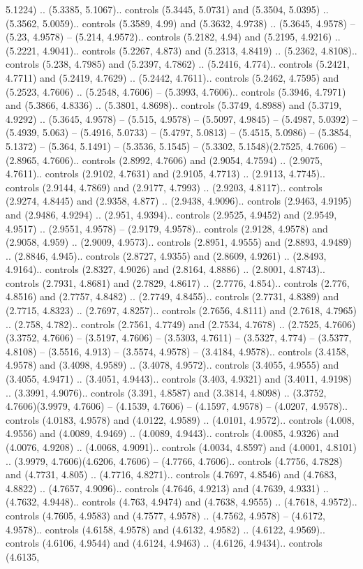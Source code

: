 5.1224) .. (5.3385, 5.1067).. controls (5.3445, 5.0731) and (5.3504, 5.0395) .. (5.3562, 5.0059).. controls (5.3589, 4.99) and (5.3632, 4.9738) .. (5.3645, 4.9578) -- (5.23, 4.9578) -- (5.214, 4.9572).. controls (5.2182, 4.94) and (5.2195, 4.9216) .. (5.2221, 4.9041).. controls (5.2267, 4.873) and (5.2313, 4.8419) .. (5.2362, 4.8108).. controls (5.238, 4.7985) and (5.2397, 4.7862) .. (5.2416, 4.774).. controls (5.2421, 4.7711) and (5.2419, 4.7629) .. (5.2442, 4.7611).. controls (5.2462, 4.7595) and (5.2523, 4.7606) .. (5.2548, 4.7606) -- (5.3993, 4.7606).. controls (5.3946, 4.7971) and (5.3866, 4.8336) .. (5.3801, 4.8698).. controls (5.3749, 4.8988) and (5.3719, 4.9292) .. (5.3645, 4.9578) -- (5.515, 4.9578) -- (5.5097, 4.9845) -- (5.4987, 5.0392) -- (5.4939, 5.063) -- (5.4916, 5.0733) -- (5.4797, 5.0813) -- (5.4515, 5.0986) -- (5.3854, 5.1372) -- (5.364, 5.1491) -- (5.3536, 5.1545) -- (5.3302, 5.1548)(2.7525, 4.7606) -- (2.8965, 4.7606).. controls (2.8992, 4.7606) and (2.9054, 4.7594) .. (2.9075, 4.7611).. controls (2.9102, 4.7631) and (2.9105, 4.7713) .. (2.9113, 4.7745).. controls (2.9144, 4.7869) and (2.9177, 4.7993) .. (2.9203, 4.8117).. controls (2.9274, 4.8445) and (2.9358, 4.877) .. (2.9438, 4.9096).. controls (2.9463, 4.9195) and (2.9486, 4.9294) .. (2.951, 4.9394).. controls (2.9525, 4.9452) and (2.9549, 4.9517) .. (2.9551, 4.9578) -- (2.9179, 4.9578).. controls (2.9128, 4.9578) and (2.9058, 4.959) .. (2.9009, 4.9573).. controls (2.8951, 4.9555) and (2.8893, 4.9489) .. (2.8846, 4.945).. controls (2.8727, 4.9355) and (2.8609, 4.9261) .. (2.8493, 4.9164).. controls (2.8327, 4.9026) and (2.8164, 4.8886) .. (2.8001, 4.8743).. controls (2.7931, 4.8681) and (2.7829, 4.8617) .. (2.7776, 4.854).. controls (2.776, 4.8516) and (2.7757, 4.8482) .. (2.7749, 4.8455).. controls (2.7731, 4.8389) and (2.7715, 4.8323) .. (2.7697, 4.8257).. controls (2.7656, 4.8111) and (2.7618, 4.7965) .. (2.758, 4.782).. controls (2.7561, 4.7749) and (2.7534, 4.7678) .. (2.7525, 4.7606)(3.3752, 4.7606) -- (3.5197, 4.7606) -- (3.5303, 4.7611) -- (3.5327, 4.774) -- (3.5377, 4.8108) -- (3.5516, 4.913) -- (3.5574, 4.9578) -- (3.4184, 4.9578).. controls (3.4158, 4.9578) and (3.4098, 4.9589) .. (3.4078, 4.9572).. controls (3.4055, 4.9555) and (3.4055, 4.9471) .. (3.4051, 4.9443).. controls (3.403, 4.9321) and (3.4011, 4.9198) .. (3.3991, 4.9076).. controls (3.391, 4.8587) and (3.3814, 4.8098) .. (3.3752, 4.7606)(3.9979, 4.7606) -- (4.1539, 4.7606) -- (4.1597, 4.9578) -- (4.0207, 4.9578).. controls (4.0183, 4.9578) and (4.0122, 4.9589) .. (4.0101, 4.9572).. controls (4.008, 4.9556) and (4.0089, 4.9469) .. (4.0089, 4.9443).. controls (4.0085, 4.9326) and (4.0076, 4.9208) .. (4.0068, 4.9091).. controls (4.0034, 4.8597) and (4.0001, 4.8101) .. (3.9979, 4.7606)(4.6206, 4.7606) -- (4.7766, 4.7606).. controls (4.7756, 4.7828) and (4.7731, 4.805) .. (4.7716, 4.8271).. controls (4.7697, 4.8546) and (4.7683, 4.8822) .. (4.7657, 4.9096).. controls (4.7646, 4.9213) and (4.7639, 4.9331) .. (4.7632, 4.9448).. controls (4.763, 4.9474) and (4.7638, 4.9555) .. (4.7618, 4.9572).. controls (4.7605, 4.9583) and (4.7577, 4.9578) .. (4.7562, 4.9578) -- (4.6172, 4.9578).. controls (4.6158, 4.9578) and (4.6132, 4.9582) .. (4.6122, 4.9569).. controls (4.6106, 4.9544) and (4.6124, 4.9463) .. (4.6126, 4.9434).. controls (4.6135, 